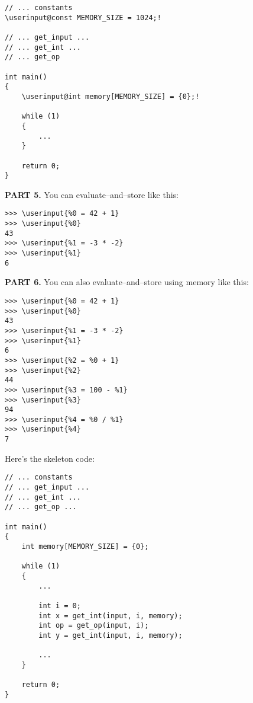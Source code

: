 \begin{Verbatim}[frame=single, commandchars=\\\@\!]
// ... constants
\userinput@const MEMORY_SIZE = 1024;!

// ... get_input ...
// ... get_int ...
// ... get_op

int main()
{
    \userinput@int memory[MEMORY_SIZE] = {0};!

    while (1)
    {
        ...        
    }

    return 0;
}
\end{Verbatim}

\textbf{PART 5.} You can evaluate--and--store like this: 

\begin{Verbatim}[frame=single, commandchars=\\\{\}]
>>> \userinput{%0 = 42 + 1}
>>> \userinput{%0}
43
>>> \userinput{%1 = -3 * -2}
>>> \userinput{%1}
6
\end{Verbatim}

\textbf{PART 6.} You can also evaluate--and--store using memory like this:

\begin{Verbatim}[frame=single, commandchars=\\\{\}]
>>> \userinput{%0 = 42 + 1}
>>> \userinput{%0}
43
>>> \userinput{%1 = -3 * -2}
>>> \userinput{%1}
6
>>> \userinput{%2 = %0 + 1}
>>> \userinput{%2}
44
>>> \userinput{%3 = 100 - %1}
>>> \userinput{%3}
94
>>> \userinput{%4 = %0 / %1}
>>> \userinput{%4}
7
\end{Verbatim}

Here's the skeleton code:

\begin{Verbatim}[frame=single, commandchars=\\\@\!]
// ... constants
// ... get_input ...
// ... get_int ...
// ... get_op ...

int main()
{
    int memory[MEMORY_SIZE] = {0};

    while (1)
    {
        ...

        int i = 0;
        int x = get_int(input, i, memory);
        int op = get_op(input, i);
        int y = get_int(input, i, memory);

        ...        
    }

    return 0;
}
\end{Verbatim}

